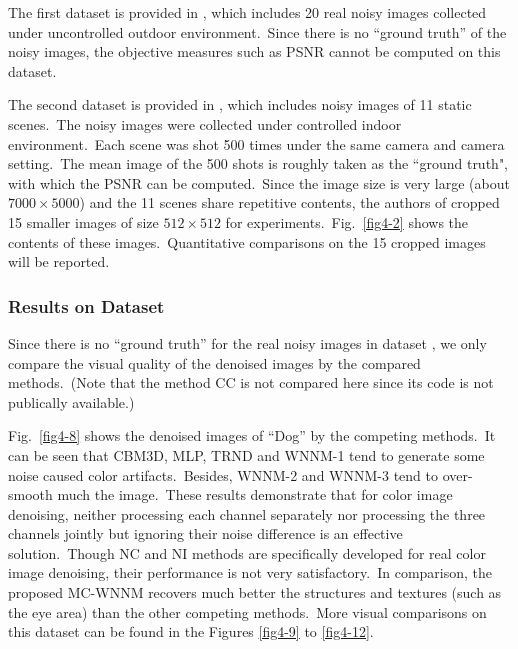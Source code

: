 The first dataset is provided in \cite{ncwebsite}, which includes 20 real noisy images collected under uncontrolled outdoor environment.\ Since there is no ``ground truth'' of the noisy images, the objective measures such as PSNR cannot be computed on this dataset.

The second dataset is provided in \cite{crosschannel2016}, which includes noisy images of 11 static scenes.\ The noisy images were collected under controlled indoor environment.\ Each scene was shot 500 times under the same camera and camera setting.\ The mean image of the 500 shots is roughly taken as the ``ground truth", with which the PSNR can be computed.\ Since the image size is very large (about $7000\times5000$) and the 11 scenes share repetitive contents, the authors of \cite{crosschannel2016} cropped 15 smaller images of size $512\times512$ for experiments.\ Fig.\ \ref{fig4-2} shows the contents of these images.\ Quantitative comparisons on the 15 cropped images will be reported. 

\subsubsection{Results on Dataset \cite{ncwebsite}}

\quad Since there is no ``ground truth'' for the real noisy images in dataset \cite{ncwebsite}, we only compare the visual quality of the denoised images by the compared methods.\ (Note that the method CC \cite{crosschannel2016} is not compared here since its code is not publically available.)

Fig.\ \ref{fig4-8} shows the denoised images of ``Dog'' by the competing methods.\ It can be seen that CBM3D, MLP, TRND and WNNM-1 tend to generate some noise caused color artifacts.\ Besides, WNNM-2 and WNNM-3 tend to over-smooth much the image.\ These results demonstrate that for color image denoising, neither processing each channel separately nor processing the three channels jointly but ignoring their noise difference is an effective solution.\ Though NC and NI methods are specifically developed for real color image denoising, their performance is not very satisfactory.\ In comparison, the proposed MC-WNNM recovers much better the structures and textures (such as the eye area) than the other competing methods.\ More visual comparisons on this dataset can be found in the Figures \ref{fig4-9} to \ref{fig4-12}.

